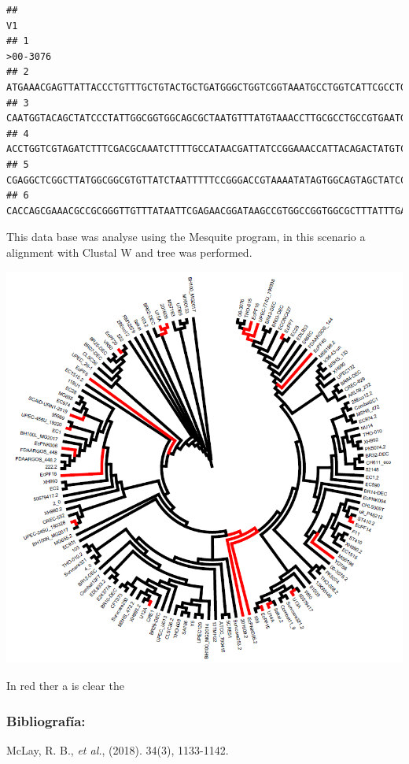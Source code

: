 \documentclass[
]{article}
\begin{document}
\begin{verbatim}
##                                                                                 V1
## 1                                                                         >00-3076
## 2 ATGAAACGAGTTATTACCCTGTTTGCTGTACTGCTGATGGGCTGGTCGGTAAATGCCTGGTCATTCGCCTGTAAAACCGC
## 3 CAATGGTACAGCTATCCCTATTGGCGGTGGCAGCGCTAATGTTTATGTAAACCTTGCGCCTGCCGTGAATGTGGGGCAAA
## 4 ACCTGGTCGTAGATCTTTCGACGCAAATCTTTTGCCATAACGATTATCCGGAAACCATTACAGACTATGTCACACTGCAA
## 5 CGAGGCTCGGCTTATGGCGGCGTGTTATCTAATTTTTCCGGGACCGTAAAATATAGTGGCAGTAGCTATCCATTTCCGAC
## 6 CACCAGCGAAACGCCGCGGGTTGTTTATAATTCGAGAACGGATAAGCCGTGGCCGGTGGCGCTTTATTTGACGCCTGTGA
\end{verbatim}

This data base was analyse using the Mesquite program, in this scenario
a alignment with Clustal W and tree was performed.

\includegraphics{images/tree.tif}

In red ther a is clear the

\hypertarget{bibliografuxeda}{%
\subsubsection{Bibliografía:}\label{bibliografuxeda}}

McLay, R. B., \emph{et al.}, (2018). 34(3), 1133-1142.
\end{document}
